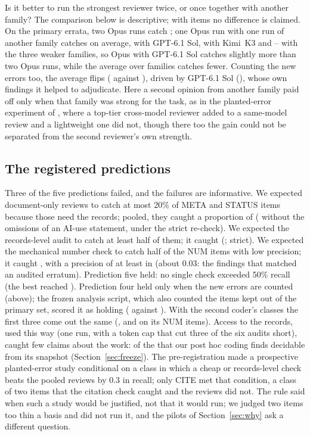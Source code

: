 \documentclass[11pt]{article}
\begin{document}
Is it better to run the strongest reviewer twice, or once together with another family? The comparison below is descriptive; with
\NrefPrimary{} items no difference is claimed. On the primary errata, two Opus runs
catch \SecSame; one Opus run with one run of another family catches \SecCross{} on average, \SecCrossGpt{} with GPT-6.1 Sol,
\SecCrossKimi{} with Kimi~K3 and \SecCrossWeakLo--\SecCrossWeakHi{} with the three weaker families, so Opus with GPT-6.1 Sol catches
slightly more than two Opus runs, while the average over families catches fewer. Counting the new errors too, the average flips (\SecSameU{} against \SecCrossU), driven by GPT-6.1 Sol (\SecCrossGptU), whose own findings it helped to
adjudicate. Here a second opinion from another family paid off only when that family was strong for the task, as in the planted-error experiment
of \citet{song2026second}, where a top-tier cross-model reviewer added to a same-model review and a lightweight one did not, though there too
the gain could not be separated from the second reviewer's own strength.

\subsection{The registered predictions}
\label{sec:preds}

Three of the five predictions failed, and the failures are informative. We expected document-only reviews to catch at most 20\% of
META and STATUS items because those need the records; pooled, they caught a proportion of \PredOne{} (\PredOneNoNorm{} without the
omissions of an AI-use statement, \StrictPredOne{} under the strict re-check). We expected the records-level audit to catch at least half of them; it caught \PredTwo{}
(\PredTwoNoNorm; \StrictPredTwo{} strict). We expected the mechanical number check to catch half of the NUM items with low precision;
it caught \PredThreeRec, with a precision of at least \PrecCthreeK{} in \PrecCthreeN{} (about 0.03: the findings that matched an
audited erratum). Prediction five held: no single check exceeded 50\% recall (the
best reached \PredFive). Prediction four held only when the new errors are counted (above); the frozen analysis script, which also counted the items kept
out of the primary set, scored it as holding (\PredFourSame{} against \PredFourCross). With the second coder's classes the first three
come out the same (\PredOneB, \PredTwoB{} and \PredThreeRecB{} on its \NclassNumB{} NUM items). Access to the records, used this way
(one run, with a token cap that cut three of the six audits short), caught few claims about the work: \WorkRecSnapCtwo{} of the
\WorkRecSnap{} that our post hoc coding finds decidable from its snapshot (Section~\ref{sec:freeze}). The
pre-registration made a prospective planted-error study conditional on a class in which a cheap or records-level check beats the
pooled reviews by 0.3 in recall; only CITE met that condition, a class of two items that the citation check caught and the reviews
did not. The rule said when such a study would be justified, not that it would run; we judged two items too thin a basis and did
not run it, and the pilots of Section~\ref{sec:why} ask a different question.
\end{document}
